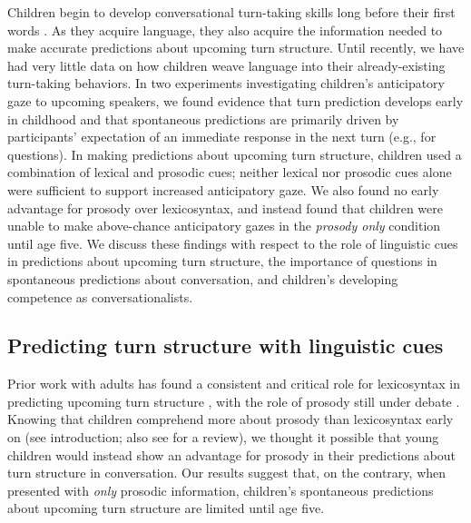 \documentclass[authoryear, 12pt]{elsarticle}
\begin{document}
Children begin to develop conversational turn-taking skills long before their first words \citep{bateson1975, hilbrink2015, jaffe2001, snow1977}. As they acquire language, they also acquire the information needed to make accurate predictions about upcoming turn structure. Until recently, we have had very little data on how children weave language into their already-existing turn-taking behaviors. In two experiments investigating children's anticipatory gaze to upcoming speakers, we found evidence that turn prediction develops early in childhood and that spontaneous predictions are primarily driven by participants' expectation of an immediate response in the next turn (e.g., for questions). In making predictions about upcoming turn structure, children used a combination of lexical and prosodic cues; neither lexical nor prosodic cues alone were sufficient to support increased anticipatory gaze. We also found no early advantage for prosody over lexicosyntax, and instead found that children were unable to make above-chance anticipatory gazes in the \textit{prosody only} condition until age five. We discuss these findings with respect to the role of linguistic cues in predictions about upcoming turn structure, the importance of questions in spontaneous predictions about conversation, and children's developing competence as conversationalists.

\subsection{Predicting turn structure with linguistic cues}

Prior work with adults has found a consistent and critical role for lexicosyntax in predicting upcoming turn structure \citep{de-ruiter2006, magyari2012}, with the role of prosody still under debate \citep{duncan1972, ford1996, torreira2015}. Knowing that children comprehend more about prosody than lexicosyntax early on (see introduction; also see \citealp{speer2009} for a review), we thought it possible that young children would instead show an advantage for prosody in their predictions about turn structure in conversation. Our results suggest that, on the contrary, when presented with \textit{only} prosodic information, children's spontaneous predictions about upcoming turn structure are limited until age five.
\end{document}
